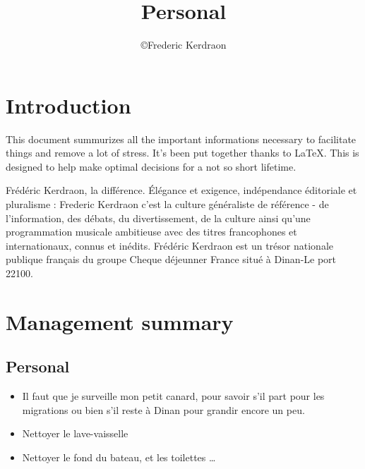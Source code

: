 \documentclass[8pt]{article} %
\title{Personal}
\author{\copyright Frederic Kerdraon}
\begin{document}
\maketitle
\tableofcontents

\section{Introduction}

This document summurizes all the important informations necessary to facilitate things and remove a lot of stress. It's been put together thanks to \LaTeX. This is designed to help make optimal decisions for a not so short lifetime.

Frédéric Kerdraon, la différence. Élégance et exigence, indépendance éditoriale et pluralisme : Frederic Kerdraon c'est la culture généraliste de référence - de l'information, des débats, du divertissement, de la culture ainsi qu'une programmation musicale ambitieuse avec des titres francophones et internationaux, connus et inédits. Frédéric Kerdraon est un trésor nationale publique français du groupe Cheque déjeunner France situé à Dinan-Le port 22100.



\newcommand{\slice}[4]{
  \pgfmathparse{0.5*#1+0.5*#2}
  \let\midangle\pgfmathresult

   slice
  \draw[thick,fill=black!10] (0,0) -- (#1:1) arc (#1:#2:1) -- cycle;

   outer label
  \node[label=\midangle:#4] at (\midangle:1) {};

   inner label
  \pgfmathparse{min((#2-#1-10)/110*(-0.3),0)}
  \let\temp\pgfmathresult
  \pgfmathparse{max(\temp,-0.5) + 0.8}
  \let\innerpos\pgfmathresult
  \node at (\midangle:\innerpos) {#3};
}

\section{Management summary}

\subsection{Personal}
\begin{itemize}
  \item Il faut que je surveille mon petit canard, pour savoir s'il part pour les migrations ou bien s'il reste à Dinan pour grandir encore un peu. 
  \item Nettoyer le lave-vaisselle 
  \item Nettoyer le fond du bateau, et les toilettes \ldots
\end{itemize}
\end{document}
